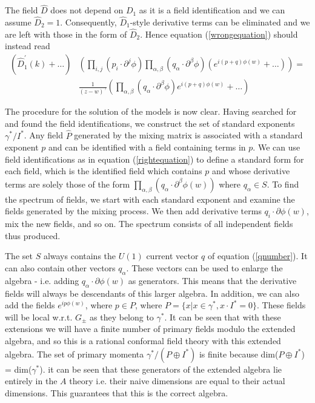 \documentclass[a4paper,a4paper]{article}
\begin{document}
The field $\hat{D}$ does not depend on $D_1$ as it is a field identification and we can assume $\hat{D}_2 = 1$.
Consequently, $\hat{D}_1$-style derivative terms can be eliminated and we are left with those in the form of $\hat{D}_2$.
Hence equation (\ref{wrongequation}) should instead read
\begin{eqnarray}
\label{rightequation}
\left( \hat{D}_1^{'}(k) + \ldots \right) & \left(\prod_{i,j} (p_i \cdot \partial^j \phi) \prod_{\alpha,\beta} 
(q_{\alpha} \cdot \partial^{\beta} \phi)(e^{i(p+q)\phi(w)} + \ldots )\right) = \nonumber\\
& \frac{1}{(z-w)^{\gamma}} \left( \prod_{\alpha,\beta} (q_{\alpha} \cdot \partial^{\beta} \phi) e^{i(p+q)\phi(w)} + \ldots \right) 
\end{eqnarray}
   
The procedure for the solution of the models is now clear. Having searched for and found the field identifications, we construct the set of standard exponents
$\gamma^{*}/I^{*}$. Any field $\hat{P}$ generated by the mixing matrix is associated with a standard exponent $p$ and 
can be identified with a field containing terms in $p$. We can use field identifications as in equation (\ref{rightequation})
to define a standard form for each field,
which is the identified field which contains $p$ and whose derivative terms are solely those of the form 
$\prod_{\alpha,\beta} (q_\alpha \cdot \partial^{\beta} \phi(w))$ where $q_{\alpha} \in S$. To find the spectrum 
of fields, we start with each standard exponent and examine the fields generated by the mixing process.
We then add derivative terms $q_i \cdot \partial\phi(w)$, mix the new fields, and so on. The spectrum consists of all
independent fields thus produced.

The set  $S$ always contains the $U(1)$ current vector
$q$ of equation (\ref{qnumber}). It can also contain other vectors $q_{\alpha}$. These vectors can be used
to enlarge the algebra - i.e. adding $q_{\alpha} \cdot \partial \phi(w)$ as generators. This means that the
derivative fields will always be descendants of this larger algebra. In addition, we can also add the fields
$e^{ip\phi(w)}$, where $p \in P$, where $P = \{ x | x \in \gamma^*,  x \cdot I^* = 0\}$. These fields will be local w.r.t. $G_{\pm}$ as they belong to 
$\gamma^*$. It can be seen that with these extensions we will have a finite number of primary fields modulo the extended algebra, and so 
this is a rational conformal field theory with this extended algebra. The set of primary momenta $\gamma^* / (P \oplus I^*)$ is finite because
dim($P\oplus I^*$) = dim($\gamma^*$). it can be seen that these generators of the extended algebra lie entirely in the $A$ theory i.e. 
their naive dimensions are equal to their actual dimensions. This guarantees that this is the correct algebra. 
\end{document}
